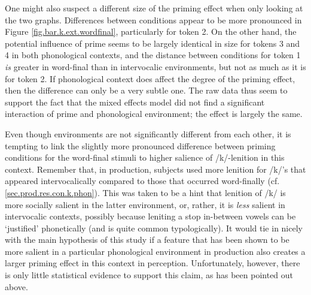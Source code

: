 One might also suspect a different size of the priming effect when only looking at the two graphs.
Differences between conditions appear to be more pronounced in Figure \ref{fig.bar.k.ext.wordfinal}, particularly for token 2.
On the other hand, the potential influence of prime seems to be largely identical in size for tokens 3 and 4 in both phonological contexts, and the distance between conditions for token 1 \emph{is} greater in word-final than in intervocalic environments, but not as much as it is for token 2.
If phonological context does affect the degree of the priming effect, then the difference can only be a very subtle one.
The raw data thus seem to support the fact that the mixed effects model did not find a significant interaction of prime and phonological environment; the effect is largely the same.

Even though environments are not significantly different from each other, it is tempting to link the slightly more pronounced difference between priming conditions for the word-final stimuli to higher salience of /k/-lenition in this context.
Remember that, in production, subjects used more lenition for /k/'s that appeared intervocalically compared to those that occurred word-finally (cf. \ref{sec.prod.res.con.k.phon}).
This was taken to be a hint that lenition of /k/ is more socially salient in the latter environment, or, rather, it is \emph{less} salient in intervocalic contexts, possibly because leniting a stop in-between vowels can be `justified' phonetically (and is quite common typologically).
It would tie in nicely with the main hypothesis of this study if a feature that has been shown to be more salient in a particular phonological environment in production also creates a larger priming effect in this context in perception.
Unfortunately, however, there is only little statistical evidence to support this claim, as has been pointed out above.

